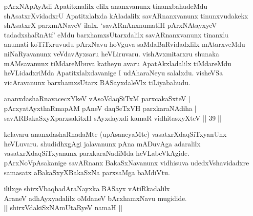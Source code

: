 {pArxNApAyAdi Apatitxnalilx elilx ananxvanunx tinanxbahudeMdu shAsatxrXvidadxrU Apatitxlalxda kAladalilx savARnanxvanunx tinunxvudakekx shAsatxrX parxmANaveV ilalx. `savARnAnxnumatiH pArxNAtayxyeV tadadxshaRnAtf' eMdu barxhamxsUtarxdalilx savARnanxvanunx tinanxlu anumati koTiTxruvudu pArxNavu hoVguva saMdaBaRvidadxlilx mAtarxveMdu niNaRyavanunx veVdavAyxsaru heVLiruvaru. vishAvxmitarxru shunaka mAMsavanunx tiMdareMbuva katheyu avaru ApatAkxladalilx tiMdareMdu heVLidadxriMda Apatitxlalxdavanige I udAharaNeyu salalxdu. visheVSa vicAravanunx barxhamxsUtarx BASayxdaleVlx tiLiyabahudu.}
\begin{shl}
\footnotemark[1]ananxdashaRnavacecxYkeV vAsoVdaqSiTxM parxcakaSxteV | \\
pArxyatAyxthaRmapAM pAneV daqSeTxVH parxkaraNAdiha | \\
savARBakaSxyXparxsakitxH sAyxdayxdi kamaR vidhitasxyXteV \hfill|| 39 || 
\end{shl}

\begin{artha}
kelavaru ananxdashaRnadaMte (upAsaneyaMte) vasatxrXdaqSiTxyanUnx 
heVLuvaru. shudidhxgAgi jalavanunx pAna mADuvAga adaralilx 
vasatxrXdaqSiTxyanunx parxkaraNadiMda heVLabeVkAgide. 
pArxNoVpAsakanige savARnanx BakaSxNavanunx vidhisuva udedxVshavidadxre 
samasatx aBakaSxyXBakaSxNa parxsaMga baMdiVtu.
\end{artha}

\begin{center}
ililxge shirxVbaqhadAraNayxka BASayx vAtiRkadalilx\\
AraneV adhAyxyadalilx oMdaneV bArxhamxNavu mugidide.\\
|| shirxVdakiSxNAmUtaRyeV namaH ||
\end{center}
